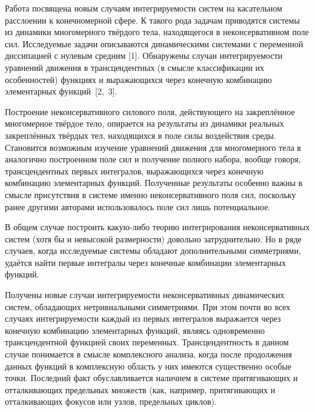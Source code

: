 


\vzmscaption

Работа посвящена новым случаям интегрируемости систем на касательном
расслоении к конечномерной сфере. К такого рода задачам приводятся
системы из динамики многомерного твёрдого тела, находящегося в
неконсервативном поле сил. Исследуемые задачи описываются
динамическими системами с переменной диссипацией с нулевым средним
[1]. Обнаружены случаи интегрируемости уравнений движения в
трансцендентных (в смысле классификации их особенностей) функциях и
выражающихся через конечную комбинацию элементарных функций~[2,~3].

Построение неконсервативного силового поля, действующего на
закреплённое многомерное твёрдое тело, опирается на результаты из
динамики реальных закреплённых твёрдых тел, находящихся в поле силы
воздействия среды. Становится возможным изучение уравнений движения
для многомерного тела в аналогично построенном поле сил и получение
полного набора, вообще говоря, трансцендентных первых интегралов,
выражающихся через конечную комбинацию элементарных функций.
Полученные результаты особенно важны в смысле присутствия в системе
именно неконсервативного поля сил, поскольку ранее другими авторами
использовалось поле сил лишь потенциальное.



В общем случае построить какую-либо теорию интегрирования
неконсервативных систем (хотя бы и невысокой размерности) довольно
затруднительно. Но в ряде случаев, когда исследуемые системы
обладают дополнительными симметриями, удаётся найти первые интегралы
через конечные комбинации элементарных функций.

Получены новые случаи интегрируемости неконсервативных динамических
систем, обладающих нетривиальными симметриями. При этом почти во
всех случаях интегрируемости каждый из первых интегралов выражается
через конечную комбинацию элементарных функций, являясь одновременно
трансцендентной функцией своих переменных. Трансцендентность в
данном случае понимается в смысле комплексного анализа, когда после
продолжения данных функций в комплексную область у них имеются
существенно особые точки. Последний факт обуславливается наличием в
системе притягивающих и отталкивающих предельных множеств (как,
например, притягивающих и отталкивающих фокусов или узлов,
предельных циклов).



